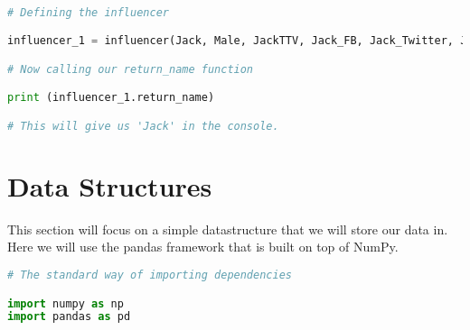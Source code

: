 \documentclass[12pt, letterpaper]{article}
\begin{document}
\begin{lstlisting}[language=python]

# Defining the influencer

influencer_1 = influencer(Jack, Male, JackTTV, Jack_FB, Jack_Twitter, Jack_YT, Jack_Insta, Jack_Twitch)

# Now calling our return_name function

print (influencer_1.return_name)

# This will give us 'Jack' in the console.

\end{lstlisting}

\section{Data Structures}
This section will focus on a simple datastructure that we will store our data in. Here we will use the pandas framework that is built on top of NumPy.

\begin{lstlisting}[language=python]
# The standard way of importing dependencies

import numpy as np
import pandas as pd




\end{lstlisting}
\end{document}
